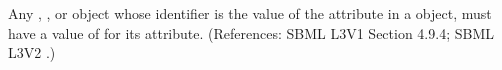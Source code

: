 Any \Compartment, \Species, \Parameter or \SpeciesReference object whose
identifier is the value of the attribute  in a \RateRule
object, must have a value of  for its 
attribute.  (References: SBML L3V1 Section 4.9.4; SBML L3V2 .)
